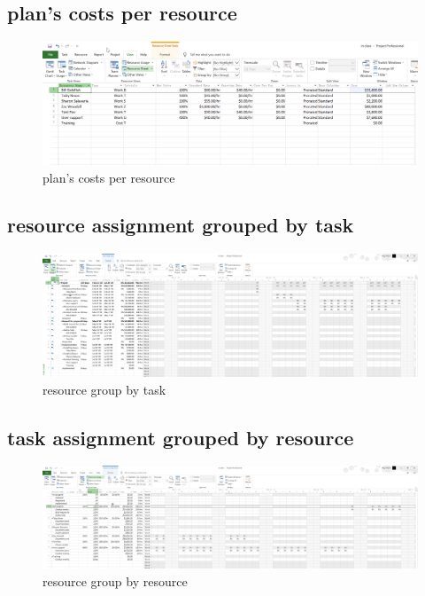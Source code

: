 \documentclass[runningheads]{llncs}
\begin{document}
\subsection{plan's costs per resource}
\begin{figure}[H]
    \centering
    \includegraphics[width=1.0\textwidth]{./image/figure2}
    \caption{plan's costs per resource}
    \label{}
\end{figure}

\subsection{resource assignment grouped by task}
\begin{figure}[H]
    \centering
    \includegraphics[width=1.0\textwidth]{./image/figure3}
    \caption{resource group by task}
    \label{}
\end{figure}

\subsection{task assignment grouped by resource}
\begin{figure}[H]
    \centering
    \includegraphics[width=1.0\textwidth]{./image/figure4}
    \caption{resource group by resource}
    \label{}
\end{figure}
\end{document}
